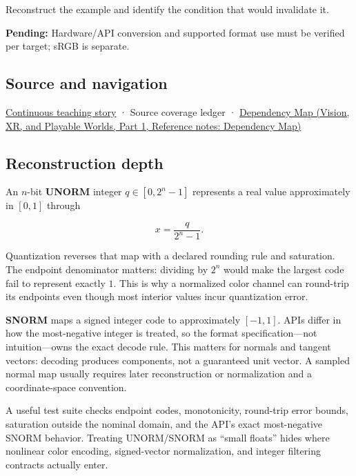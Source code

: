 \hypertarget{appendix-b2402c453dac-recall-and-next-depth}{}

Reconstruct the example and identify the condition that would invalidate it.

\textbf{Pending:} Hardware/API conversion and supported format use must be verified per target; sRGB is separate.

\subsection{Source and navigation}\label{appendix-b2402c453dac-source-and-navigation}

\hypertarget{appendix-b2402c453dac-source-and-navigation}{}

\hyperref[01-foundations-i-ch001-choosing-what-information-to-keep]{Continuous teaching story} · {Source coverage ledger} · \href{../07-Vision-XR-and-Playable-Worlds-P01/main.pdf\#nameddest=appendix-4ad47bdd269a}{Dependency Map (Vision, XR, and Playable Worlds, Part 1, Reference notes: Dependency Map)}

\subsection{Reconstruction depth}\label{appendix-b2402c453dac-reconstruction-depth}

\hypertarget{appendix-b2402c453dac-reconstruction-depth}{}

An \(n\)-bit \textbf{UNORM} integer \(q\in[0,2^n-1]\) represents a real value approximately in \([0,1]\) through

\[
x = \frac{q}{2^n-1}.
\]

Quantization reverses that map with a declared rounding rule and saturation. The endpoint denominator matters: dividing by \(2^n\) would make the largest code fail to represent exactly \(1\). This is why a normalized color channel can round-trip its endpoints even though most interior values incur quantization error.

\textbf{SNORM} maps a signed integer code to approximately \([-1,1]\). APIs differ in how the most-negative integer is treated, so the format specification---not intuition---owns the exact decode rule. This matters for normals and tangent vectors: decoding produces components, not a guaranteed unit vector. A sampled normal map usually requires later reconstruction or normalization and a coordinate-space convention.

A useful test suite checks endpoint codes, monotonicity, round-trip error bounds, saturation outside the nominal domain, and the API's exact most-negative SNORM behavior. Treating UNORM/SNORM as ``small floats'' hides where nonlinear color encoding, signed-vector normalization, and integer filtering contracts actually enter.
